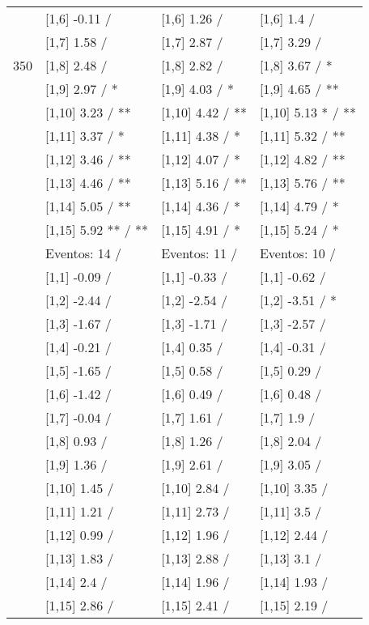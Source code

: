 \begin{table}
\begin{tabular}[t]{llll}
 & {}[1,6] -0.11  / & {}[1,6] 1.26  / & {}[1,6] 1.4  /\\
 & {}[1,7] 1.58  / & {}[1,7] 2.87  / & {}[1,7] 3.29  /\\
350 & {}[1,8] 2.48  / & {}[1,8] 2.82  / & {}[1,8] 3.67  / *\\
\addlinespace
 & {}[1,9] 2.97  / * & {}[1,9] 4.03  / * & {}[1,9] 4.65  / **\\
 & {}[1,10] 3.23  / ** & {}[1,10] 4.42  / ** & {}[1,10] 5.13 * / **\\
 & {}[1,11] 3.37  / * & {}[1,11] 4.38  / * & {}[1,11] 5.32  / **\\
 & {}[1,12] 3.46  / ** & {}[1,12] 4.07  / * & {}[1,12] 4.82  / **\\
 & {}[1,13] 4.46  / ** & {}[1,13] 5.16  / ** & {}[1,13] 5.76  / **\\
\addlinespace
 & {}[1,14] 5.05  / ** & {}[1,14] 4.36  / * & {}[1,14] 4.79  / *\\
 & {}[1,15] 5.92 ** / ** & {}[1,15] 4.91  / * & {}[1,15] 5.24  / *\\
 & Eventos:  14 / & Eventos:  11 / & Eventos:  10 /\\
 & {}[1,1] -0.09  / & {}[1,1] -0.33  / & {}[1,1] -0.62  /\\
 & {}[1,2] -2.44  / & {}[1,2] -2.54  / & {}[1,2] -3.51  / *\\
\addlinespace
 & {}[1,3] -1.67  / & {}[1,3] -1.71  / & {}[1,3] -2.57  /\\
 & {}[1,4] -0.21  / & {}[1,4] 0.35  / & {}[1,4] -0.31  /\\
 & {}[1,5] -1.65  / & {}[1,5] 0.58  / & {}[1,5] 0.29  /\\
 & {}[1,6] -1.42  / & {}[1,6] 0.49  / & {}[1,6] 0.48  /\\
 & {}[1,7] -0.04  / & {}[1,7] 1.61  / & {}[1,7] 1.9  /\\
\addlinespace
500 & {}[1,8] 0.93  / & {}[1,8] 1.26  / & {}[1,8] 2.04  /\\
 & {}[1,9] 1.36  / & {}[1,9] 2.61  / & {}[1,9] 3.05  /\\
 & {}[1,10] 1.45  / & {}[1,10] 2.84  / & {}[1,10] 3.35  /\\
 & {}[1,11] 1.21  / & {}[1,11] 2.73  / & {}[1,11] 3.5  /\\
 & {}[1,12] 0.99  / & {}[1,12] 1.96  / & {}[1,12] 2.44  /\\
\addlinespace
 & {}[1,13] 1.83  / & {}[1,13] 2.88  / & {}[1,13] 3.1  /\\
 & {}[1,14] 2.4  / & {}[1,14] 1.96  / & {}[1,14] 1.93  /\\
 & {}[1,15] 2.86  / & {}[1,15] 2.41  / & {}[1,15] 2.19  /\\
\bottomrule
\end{tabular}
\end{table}
